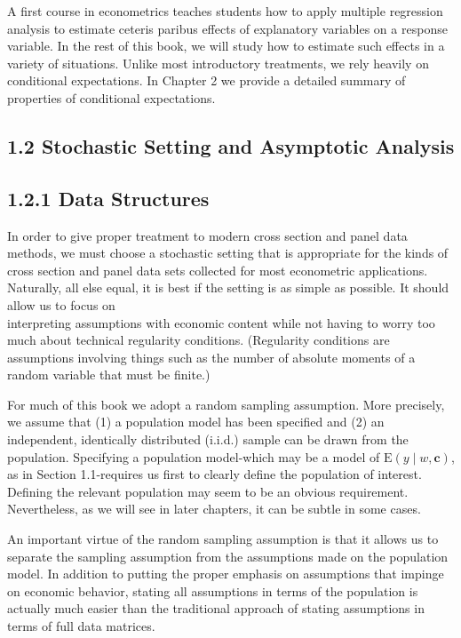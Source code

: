 \documentclass[10pt]{article}
\begin{document}
A first course in econometrics teaches students how to apply multiple regression analysis to estimate ceteris paribus effects of explanatory variables on a response variable. In the rest of this book, we will study how to estimate such effects in a variety of situations. Unlike most introductory treatments, we rely heavily on conditional expectations. In Chapter 2 we provide a detailed summary of properties of conditional expectations.

\subsection*{1.2 Stochastic Setting and Asymptotic Analysis}
\subsection*{1.2.1 Data Structures}
In order to give proper treatment to modern cross section and panel data methods, we must choose a stochastic setting that is appropriate for the kinds of cross section and panel data sets collected for most econometric applications. Naturally, all else equal, it is best if the setting is as simple as possible. It should allow us to focus on\\
interpreting assumptions with economic content while not having to worry too much about technical regularity conditions. (Regularity conditions are assumptions involving things such as the number of absolute moments of a random variable that must be finite.)

For much of this book we adopt a random sampling assumption. More precisely, we assume that (1) a population model has been specified and (2) an independent, identically distributed (i.i.d.) sample can be drawn from the population. Specifying a population model-which may be a model of $\mathrm{E}(y \mid w, \mathbf{c})$, as in Section 1.1-requires us first to clearly define the population of interest. Defining the relevant population may seem to be an obvious requirement. Nevertheless, as we will see in later chapters, it can be subtle in some cases.

An important virtue of the random sampling assumption is that it allows us to separate the sampling assumption from the assumptions made on the population model. In addition to putting the proper emphasis on assumptions that impinge on economic behavior, stating all assumptions in terms of the population is actually much easier than the traditional approach of stating assumptions in terms of full data matrices.
\end{document}
